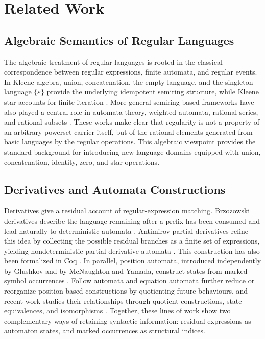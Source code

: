 \section{Related Work}

\subsection{Algebraic Semantics of Regular Languages}

The algebraic treatment of regular languages is rooted in the classical
correspondence between regular expressions, finite automata, and regular
events. In Kleene algebra, union, concatenation, the empty language, and
the singleton language $\{\varepsilon\}$ provide the underlying
idempotent semiring structure, while Kleene star accounts for finite
iteration \cite{Kozen1994}. More general semiring-based frameworks have
also played a central role in automata theory, weighted automata,
rational series, and rational subsets
\cite{KuichSalomaa1986,BerstelReutenauer2011}. These works make clear
that regularity is not a property of an arbitrary powerset carrier
itself, but of the rational elements generated from basic languages by
the regular operations. This algebraic viewpoint provides the standard
background for introducing new language domains equipped with union,
concatenation, identity, zero, and star operations.

\subsection{Derivatives and Automata Constructions}

Derivatives give a residual account of regular-expression matching.
Brzozowski derivatives describe the language remaining after a prefix
has been consumed and lead naturally to deterministic automata
\cite{brzozowski1964derivatives}. Antimirov partial derivatives refine
this idea by collecting the possible residual branches as a finite set
of expressions, yielding nondeterministic partial-derivative automata
\cite{antimirov1996partial}. This construction has also been formalized
in Coq \cite{almeida2011partial}. In parallel, position automata,
introduced independently by Glushkov and by McNaughton and Yamada,
construct states from marked symbol occurrences
\cite{glushkov1961abstract,mcnaughton1960regular}. Follow automata and
equation automata further reduce or reorganize position-based
constructions by quotienting future behaviours, and recent work studies
their relationships through quotient constructions, state equivalences,
and isomorphisms \cite{lu2025relations}. Together, these lines of work
show two complementary ways of retaining syntactic information:
residual expressions as automaton states, and marked occurrences as
structural indices.

